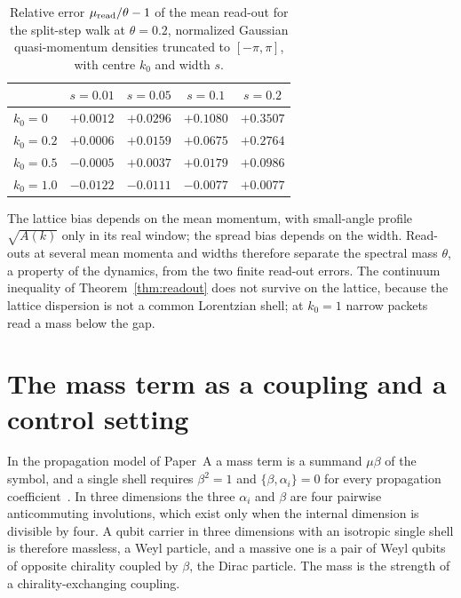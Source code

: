 \documentclass[12pt,a4paper]{article}
\theoremstyle{definition}
\theoremstyle{remark}
\begin{document}
\begin{table}[ht]
\centering
\begin{tabular}{@{}lcccc@{}}
\toprule
 & $s=0.01$ & $s=0.05$ & $s=0.1$ & $s=0.2$ \\
\midrule
$k_0=0$ & $+0.0012$ & $+0.0296$ & $+0.1080$ & $+0.3507$ \\
$k_0=0.2$ & $+0.0006$ & $+0.0159$ & $+0.0675$ & $+0.2764$ \\
$k_0=0.5$ & $-0.0005$ & $+0.0037$ & $+0.0179$ & $+0.0986$ \\
$k_0=1.0$ & $-0.0122$ & $-0.0111$ & $-0.0077$ & $+0.0077$ \\
\bottomrule
\end{tabular}
\caption{Relative error $\mu_{\rm read}/\theta-1$ of the mean read-out for the split-step walk at $\theta=0.2$, normalized Gaussian quasi-momentum densities truncated to $[-\pi,\pi]$, with centre $k_0$ and width $s$.}
\label{tab:biases}
\end{table}

The lattice bias depends on the mean momentum, with small-angle profile $\sqrt{A(k)}$ only in its real window; the spread bias depends on the width. Read-outs at several mean momenta and widths therefore separate the spectral mass $\theta$, a property of the dynamics, from the two finite read-out errors. The continuum inequality of Theorem~\ref{thm:readout} does not survive on the lattice, because the lattice dispersion is not a common Lorentzian shell; at $k_0=1$ narrow packets read a mass below the gap.

\section{The mass term as a coupling and a control setting}
\label{sec:control}

In the propagation model of Paper~A a mass term is a summand $\mu\beta$ of the symbol, and a single shell requires $\beta^2=1$ and $\{\beta,\alpha_i\}=0$ for every propagation coefficient~\cite{Liu2026QRAIFA}. In three dimensions the three $\alpha_i$ and $\beta$ are four pairwise anticommuting involutions, which exist only when the internal dimension is divisible by four. A qubit carrier in three dimensions with an isotropic single shell is therefore massless, a Weyl particle, and a massive one is a pair of Weyl qubits of opposite chirality coupled by $\beta$, the Dirac particle. The mass is the strength of a chirality-exchanging coupling.
\end{document}

